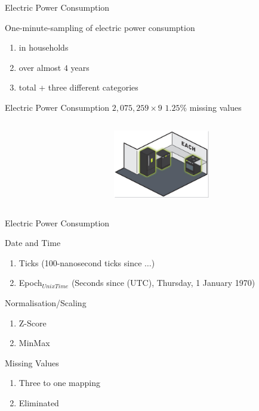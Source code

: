 \begin{frame}{Electric Power Consumption}


\bi
\mi One-minute-sampling of electric power consumption  
\begin{enumerate}
    \item in households
    \item over almost $4$ years
    \item total + three different categories 

  \end{enumerate}
\mi Electric Power Consumption
\mi $2,075,259\times9$
\mi $1.25\%$ missing values
\ei
\begin{columns}[t] %
     \begin{column}[T]{7cm} %
     
     \end{column}
     \begin{column}[T]{5cm} %
          \includegraphics[height=3cm]{fig/each.jpg}
     \end{column}
 \end{columns}

\end{frame}

\begin{frame}{Electric Power Consumption}

\begin{tcolorbox}[colback=LightSteelBlue!5,colframe=yellow!40!black,title=Preprocessing]

\bi
\mi Date and Time
\begin{enumerate}
    \item Ticks {\tiny (100-nanosecond ticks since $\ldots$)}
    \item Epoch$_{Unix Time}$ {\tiny (Seconds since (UTC), Thursday, 1
    January 1970) }
  \end{enumerate}
\mi Normalisation/Scaling
\begin{enumerate}
    \item Z-Score 
    \item MinMax 
  \end{enumerate}
  
  \mi Missing Values
\begin{enumerate}
    \item Three to one mapping 
    \item Eliminated
  \end{enumerate}
\ei


\end{tcolorbox}
\end{frame}

